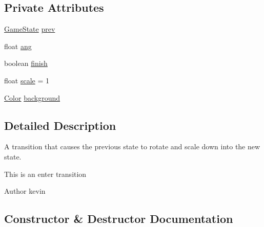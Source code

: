 \subsection*{Private Attributes}
\begin{DoxyCompactItemize}
\item 
\mbox{\hyperlink{interfaceorg_1_1newdawn_1_1slick_1_1state_1_1_game_state}{Game\+State}} \mbox{\hyperlink{classorg_1_1newdawn_1_1slick_1_1state_1_1transition_1_1_rotate_transition_a838343f7970365450d9799df4b424451}{prev}}
\item 
float \mbox{\hyperlink{classorg_1_1newdawn_1_1slick_1_1state_1_1transition_1_1_rotate_transition_aea66eb59377c5e7f66b7a91642c06130}{ang}}
\item 
boolean \mbox{\hyperlink{classorg_1_1newdawn_1_1slick_1_1state_1_1transition_1_1_rotate_transition_ab25369d5c3cf43e51ac230f817b7557d}{finish}}
\item 
float \mbox{\hyperlink{classorg_1_1newdawn_1_1slick_1_1state_1_1transition_1_1_rotate_transition_aa8eff3f2cd4d25051e010b2c95fa8ef1}{scale}} = 1
\item 
\mbox{\hyperlink{classorg_1_1newdawn_1_1slick_1_1_color}{Color}} \mbox{\hyperlink{classorg_1_1newdawn_1_1slick_1_1state_1_1transition_1_1_rotate_transition_a8ab02534f280fe5883c5348a1eb399b2}{background}}
\end{DoxyCompactItemize}


\subsection{Detailed Description}
A transition that causes the previous state to rotate and scale down into the new state.

This is an enter transition

\begin{DoxyAuthor}{Author}
kevin 
\end{DoxyAuthor}


\subsection{Constructor \& Destructor Documentation}
\mbox{\label{classorg_1_1newdawn_1_1slick_1_1state_1_1transition_1_1_rotate_transition_a83af1aebc17f3fc3433ae2802b46dc7c}} 
